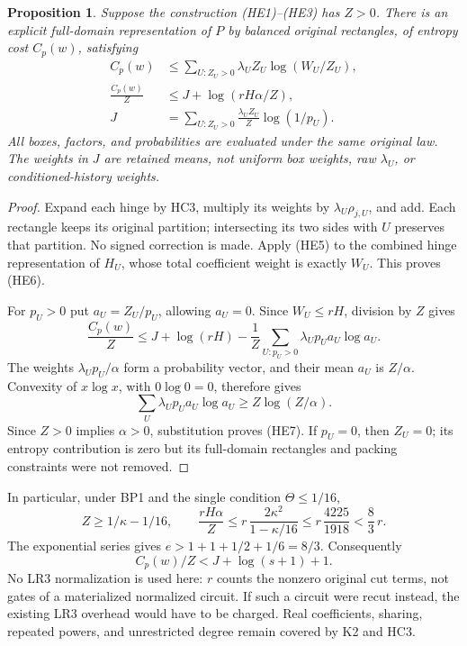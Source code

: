 \documentclass[11pt]{article}
\newtheorem{proposition}{Proposition}
\begin{document}
\begin{proposition}
Suppose the construction (HE1)--(HE3) has $Z>0$. There is an
explicit full-domain representation of $P$ by balanced original
rectangles, of entropy cost $C_p(w)$, satisfying
\[
 \begin{split}
 C_p(w)&\le
    \sum_{U:Z_U>0}\lambda_UZ_U\log(W_U/Z_U),           \tag{HE6}\\
 \frac{C_p(w)}Z&\le
     J+\log(rH\alpha/Z),\\
 J&=\sum_{U:Z_U>0}\frac{\lambda_UZ_U}{Z}
                              \log(1/p_U).           \tag{HE7}
 \end{split}
\]
All boxes, factors, and probabilities are evaluated under the
same original law. The weights in $J$ are retained means, not
uniform box weights, raw $\lambda_U$, or conditioned-history weights.
\end{proposition}
\begin{proof}
Expand each hinge by HC3, multiply its weights by
$\lambda_U\rho_{j,U}$, and add. Each rectangle keeps its original
partition; intersecting its two sides with $U$ preserves that
partition. No signed correction is made. Apply (HE5) to the
combined hinge representation of $H_U$, whose total coefficient
weight is exactly $W_U$. This proves (HE6).

For $p_U>0$ put $a_U=Z_U/p_U$, allowing $a_U=0$.
Since $W_U\le rH$, division by $Z$ gives
\[
 \frac{C_p(w)}Z\le J+\log(rH)
               -\frac1Z\sum_{U:p_U>0}
                                  \lambda_Up_Ua_U\log a_U.
                                                               \tag{HE8}
\]
The weights $\lambda_Up_U/\alpha$ form a probability vector,
and their mean $a_U$ is $Z/\alpha$. Convexity of $x\log x$,
with $0\log0=0$, therefore gives
\[
 \sum_U\lambda_Up_Ua_U\log a_U\ge Z\log(Z/\alpha).
                                                               \tag{HE9}
\]
Since $Z>0$ implies $\alpha>0$, substitution proves (HE7).
If $p_U=0$, then $Z_U=0$; its entropy contribution is zero but
its full-domain rectangles and packing constraints were not removed.
\end{proof}

In particular, under BP1 and the single condition $\Theta\le1/16$,
\[
 Z\ge1/\kappa-1/16,\qquad
 \frac{rH\alpha}{Z}\le
     r\,\frac{2\kappa^2}{1-\kappa/16}
 \le r\,\frac{4225}{1918}<\frac83\,r .
                                                               \tag{HE10}
\]
The exponential series gives $e>1+1+1/2+1/6=8/3$. Consequently
\[
                  C_p(w)/Z<J+\log(s+1)+1.             \tag{HE11}
\]
No LR3 normalization is used here: $r$ counts the nonzero original
cut terms, not gates of a materialized normalized circuit.
If such a circuit were recut instead, the existing LR3 overhead
would have to be charged. Real coefficients, sharing, repeated
powers, and unrestricted degree remain covered by K2 and HC3.
\end{document}
